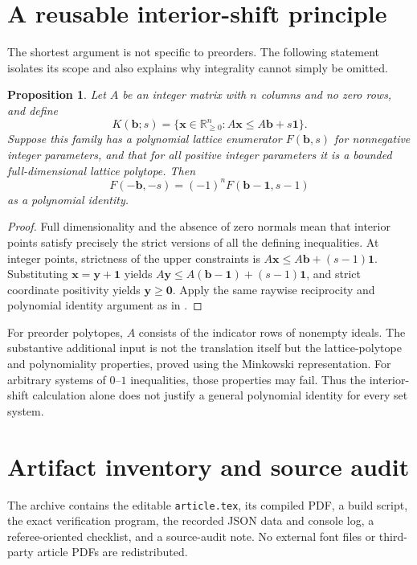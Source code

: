 \documentclass[11pt,letterpaper]{article}
\newtheorem{proposition}[proposition]{Proposition}
\theoremstyle{definition}
\newcommand{\R}{\mathbb R}
\newcommand{\one}{\mathbf 1}
\newcommand{\zero}{\mathbf 0}
\newcommand{\bvec}{\mathbf b}
\newcommand{\xvec}{\mathbf x}
\newcommand{\yvec}{\mathbf y}
\begin{document}
\appendix
\section{A reusable interior-shift principle}\label{app:general}
The shortest argument is not specific to preorders. The following statement
isolates its scope and also explains why integrality cannot simply be
omitted.

\begin{proposition}\label{prop:general-shift}
Let $A$ be an integer matrix with $n$ columns and no zero rows, and define
\[
 K(\bvec;s)=\{\xvec\in\R_{\geq0}^n:A\xvec\leq A\bvec+s\one\}.
\]
Suppose this family has a polynomial lattice enumerator $F(\bvec,s)$ for
nonnegative integer parameters, and that for all positive integer
parameters it is a bounded full-dimensional lattice polytope. Then
\[
 F(-\bvec,-s)=(-1)^n F(\bvec-\one,s-1)
\]
as a polynomial identity.
\end{proposition}
\begin{proof}
Full dimensionality and the absence of zero normals mean that interior
points satisfy precisely the strict versions of all the defining
inequalities. At integer points, strictness of the upper constraints is
$A\xvec\leq A\bvec+(s-1)\one$. Substituting
$\xvec=\yvec+\one$ yields
$A\yvec\leq A(\bvec-\one)+(s-1)\one$, and strict coordinate positivity
yields $\yvec\geq\zero$. Apply the same raywise reciprocity and polynomial
identity argument as in .
\end{proof}

For preorder polytopes, $A$ consists of the indicator rows of nonempty
ideals. The substantive additional input is not the translation itself but
the lattice-polytope and polynomiality properties, proved using the
Minkowski representation. For arbitrary systems of $0$--$1$ inequalities,
those properties may fail. Thus the interior-shift calculation alone does
not justify a general polynomial identity for every set system.

\section{Artifact inventory and source audit}\label{app:inventory}
The archive contains the editable \texttt{article.tex}, its compiled PDF,
a build script, the exact verification program, the recorded JSON data and
console log, a referee-oriented checklist, and a source-audit note.
No external font files or third-party article PDFs are redistributed.
\end{document}
